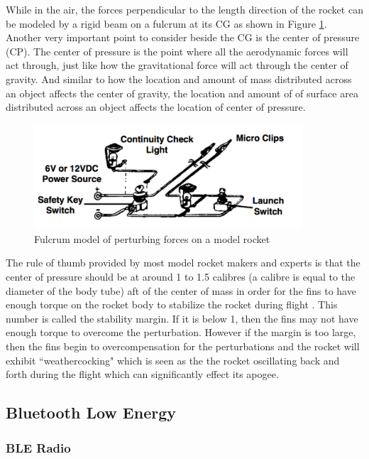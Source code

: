 \documentclass{workreport}
\begin{document}
\begin{body}
	While in the air, the forces perpendicular to the length direction of the rocket can be modeled by a rigid beam on a fulcrum at its CG as shown in Figure \ref{fig:fulcrum}. Another very important point to consider beside the CG is the center of pressure (CP). The center of pressure is the point where all the aerodynamic forces will act through, just like how the gravitational force will act through the center of gravity. And similar to how the location and amount of mass distributed across an object affects the center of gravity, the location and amount of of surface area distributed across an object affects the location of center of pressure.

	\begin{figure}[!ht]
		\centering
		\includegraphics[width=10cm]{./images/fulcrum.png}
		\caption{Fulcrum model of perturbing forces on a model rocket}
		\label{fig:fulcrum}
	\end{figure}

	The rule of thumb provided by most model rocket makers and experts is that the center of pressure should be at around 1 to 1.5 calibres (a calibre is equal to the diameter of the body tube) aft of the center of mass in order for the fins to have enough torque on the rocket body to stabilize the rocket during flight\cite{estes_rocket_tech} \cite{centuri_manual}. This number is called the stability margin. If it is below 1, then the fins may not have enough torque to overcome the perturbation. However if the margin is too large, then the fins begin to overcompensation for the perturbations and the rocket will exhibit ``weathercocking" which is seen as the the rocket oscillating back and forth during the flight which can significantly effect its apogee.
	





\subsection{Bluetooth Low Energy}

	\lipsum[1]

\subsubsection{BLE Radio}


\end{body}
\end{document}
